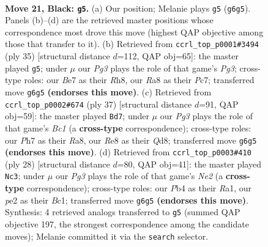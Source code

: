 \documentclass[11pt]{article}
\begin{document}
\clearpage

\begin{figure}[p]\centering
\begin{subfigure}{0.46\textwidth}\centering
\resizebox{\linewidth}{!}{%
\newchessgame
\chessboard[
  setfen={r1b1r1k1/p2nb2p/2p2pp1/3q4/Pp1p1P1P/1P1Q2P1/3NPK2/RNB2R2 b - - 0 21},
  showmover=false,
  pgfstyle=straightmove, color=movearrow, markmove={g6-g5}
]}
\caption{}
\end{subfigure}\hfill
\begin{subfigure}{0.46\textwidth}\centering
\resizebox{\linewidth}{!}{%
\newchessgame
\chessboard[
  setfen={r3k2r/2pnq3/b1pb1pp1/p3p2p/N3P3/P3B1QP/1PPN1PP1/2KR3R b kq - 2 18},
  showmover=false,
  pgfstyle=straightmove, color=movearrow, markmove={g6-g5}
]}
\caption{}
\end{subfigure}
\\[4pt]
\begin{subfigure}{0.46\textwidth}\centering
\resizebox{\linewidth}{!}{%
\newchessgame
\chessboard[
  setfen={r1bqk2r/1p3pp1/4p1np/3pP3/p2P4/Q4N1P/PP3PP1/2R1RNK1 b kq - 4 19},
  showmover=false,
  pgfstyle=straightmove, color=movearrow, markmove={c8-d7}
]}
\caption{}
\end{subfigure}\hfill
\begin{subfigure}{0.46\textwidth}\centering
\resizebox{\linewidth}{!}{%
\newchessgame
\chessboard[
  setfen={r1r5/1p1nkpbp/2p2np1/p1q1p3/P3PP2/6P1/1PP1N1BP/R1BQK2R w KQ - 0 15},
  showmover=false,
  pgfstyle=straightmove, color=movearrow, markmove={e2-c3}
]}
\caption{}
\end{subfigure}
\caption{\textbf{Move 21, Black: \texttt{g5}.} (a) Our position; Melanie plays \texttt{g5} (\texttt{g6g5}). Panels (b)--(d) are the retrieved master positions whose correspondence most drove this move (highest QAP objective among those that transfer to it). (b) Retrieved from \texttt{ccrl\_top\_p0001\#3494} (ply 35) [structural distance $d$=112, QAP obj=65]: the master played \texttt{g5}; under $\mu$ our \emph{Pg3} plays the role of that game's \emph{Pg3}; cross-type roles: our \emph{B}e7 as their \emph{R}h8, our \emph{R}a8 as their \emph{P}c7; transferred move \texttt{g6g5} \textbf{(endorses this move)}. (c) Retrieved from \texttt{ccrl\_top\_p0002\#674} (ply 37) [structural distance $d$=91, QAP obj=59]: the master played \texttt{Bd7}; under $\mu$ our \emph{Pg3} plays the role of that game's \emph{Bc1} (a \textbf{cross-type} correspondence); cross-type roles: our \emph{P}h7 as their \emph{R}a8, our \emph{R}e8 as their \emph{Q}d8; transferred move \texttt{g6g5} \textbf{(endorses this move)}. (d) Retrieved from \texttt{ccrl\_top\_p0003\#410} (ply 28) [structural distance $d$=80, QAP obj=41]: the master played \texttt{Nc3}; under $\mu$ our \emph{Pg3} plays the role of that game's \emph{Ne2} (a \textbf{cross-type} correspondence); cross-type roles: our \emph{P}b4 as their \emph{R}a1, our \emph{p}e2 as their \emph{B}c1; transferred move \texttt{g6g5} \textbf{(endorses this move)}. Synthesis: 4 retrieved analogs transferred to \texttt{g5} (summed QAP objective 197, the strongest correspondence among the candidate moves); Melanie committed it via the \texttt{search} selector.}
\label{fig:thought-m41}
\end{figure}
\end{document}
